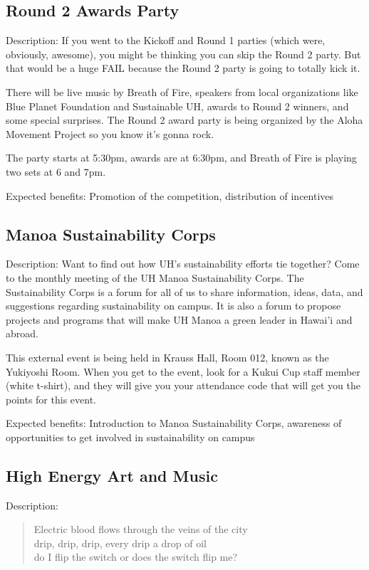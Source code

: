 \subsection{Round 2 Awards Party}

Description: If you went to the Kickoff and Round 1 parties (which were, obviously, awesome), you might be thinking you can skip the Round 2 party. But that would be a huge FAIL because the Round 2 party is going to totally kick it.

There will be live music by Breath of Fire, speakers from local organizations like Blue Planet Foundation and Sustainable UH, awards to Round 2 winners, and some special surprises.  The Round 2 award party is being organized by the Aloha Movement Project so you know it's gonna rock.

The party starts at 5:30pm, awards are at 6:30pm, and Breath of Fire is playing two sets at 6 and 7pm.

Expected benefits: Promotion of the competition, distribution of incentives


\subsection{Manoa Sustainability Corps}

Description: Want to find out how UH's sustainability efforts tie together? Come to the monthly meeting of the UH Manoa Sustainability Corps. The Sustainability Corps is a forum for all of us to share information, ideas, data, and suggestions regarding sustainability on campus. It is also a forum to propose projects and programs that will make UH Manoa a green leader in Hawai'i and abroad.

This external event is being held in Krauss Hall, Room 012, known as the Yukiyoshi Room. When you get to the event, look for a Kukui Cup staff member (white t-shirt), and they will give you your attendance code that will get you the points for this event.

Expected benefits: Introduction to Manoa Sustainability Corps, awareness of opportunities to get involved in sustainability on campus


\subsection{High Energy Art and Music}

Description:

\begin{verse}
Electric blood flows through the veins of the city\\
drip, drip, drip, every drip a drop of oil\\
do I flip the switch or does the switch flip me?\\
\end{verse}

